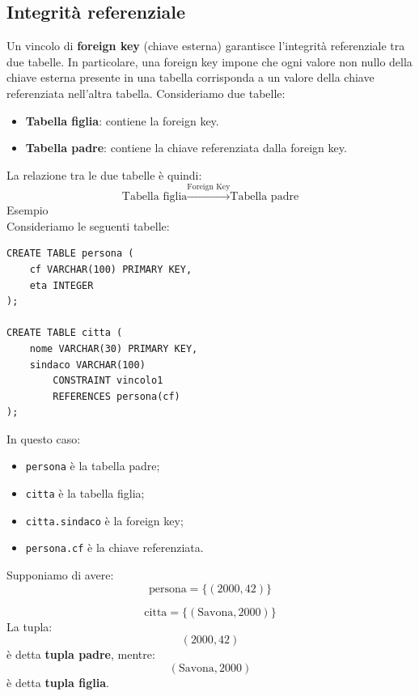 \subsection{Integrità referenziale}
Un vincolo di \textbf{foreign key} (chiave esterna)
garantisce l'integrità referenziale tra due tabelle.
In particolare, una foreign key impone che ogni
valore non nullo della chiave esterna presente
in una tabella corrisponda a un valore della
chiave referenziata nell'altra tabella.
Consideriamo due tabelle:
\begin{itemize}
    \item \textbf{Tabella figlia}: contiene la foreign key.
    \item \textbf{Tabella padre}: contiene la chiave
    referenziata dalla foreign key.
\end{itemize}
La relazione tra le due tabelle è quindi:
\[
\boxed{
\text{Tabella figlia}
\xrightarrow{\text{Foreign Key}}
\text{Tabella padre}
}
\]
\textcolor{verdeEsempio}{Esempio}\\
Consideriamo le seguenti tabelle:
\begin{verbatim}
CREATE TABLE persona (
    cf VARCHAR(100) PRIMARY KEY,
    eta INTEGER
);

CREATE TABLE citta (
    nome VARCHAR(30) PRIMARY KEY,
    sindaco VARCHAR(100)
        CONSTRAINT vincolo1
        REFERENCES persona(cf)
);
\end{verbatim}
In questo caso:
\begin{itemize}
    \item \texttt{persona} è la tabella padre;
    \item \texttt{citta} è la tabella figlia;
    \item \texttt{citta.sindaco} è la foreign key;
    \item \texttt{persona.cf} è la chiave referenziata.
\end{itemize}
\noindent Supponiamo di avere:
\[
\text{persona} =
\{(2000,42)\}
\]

\[
\text{citta} =
\{(\text{Savona},2000)\}
\]
La tupla:
\[
(2000,42)
\]
è detta \textbf{tupla padre}, mentre:
\[
(\text{Savona},2000)
\]
è detta \textbf{tupla figlia}.
